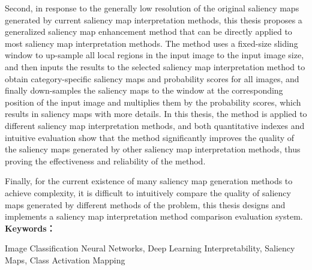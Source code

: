 Second, in response to the generally low resolution of the original saliency maps generated by current saliency map interpretation methods, this thesis proposes a generalized saliency map enhancement method that can be directly applied to most saliency map interpretation methods. The method uses a fixed-size sliding window to up-sample all local regions in the input image to the input image size, and then inputs the results to the selected saliency map interpretation method to obtain category-specific saliency maps and probability scores for all images, and finally down-samples the saliency maps to the window at the corresponding position of the input image and multiplies them by the probability scores, which results in saliency maps with more details. In this thesis, the method is applied to different saliency map interpretation methods, and both quantitative indexes and intuitive evaluation show that the method significantly improves the quality of the saliency maps generated by other saliency map interpretation methods, thus proving the effectiveness and reliability of the method.

Finally, for the current existence of many saliency map generation methods to achieve complexity, it is difficult to intuitively compare the quality of saliency maps generated by different methods of the problem, this thesis designs and implements a saliency map interpretation method comparison evaluation system.
\\

\noindent\textbf{Keywords：} 
\begin{minipage}[t]{0.85\linewidth}
	Image Classification Neural Networks, Deep Learning Interpretability, Saliency Maps, Class Activation Mapping
\end{minipage}

\clearpage